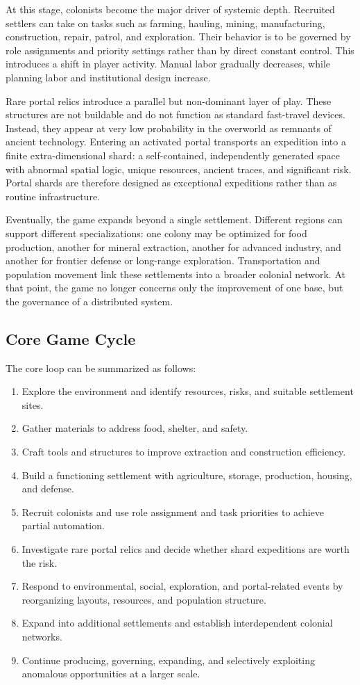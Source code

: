 \documentclass[conference]{IEEEtran}
\begin{document}
At this stage, colonists become the major driver of systemic depth. Recruited settlers can take on tasks such as farming, hauling, mining, manufacturing, construction, repair, patrol, and exploration. Their behavior is to be governed by role assignments and priority settings rather than by direct constant control. This introduces a shift in player activity. Manual labor gradually decreases, while planning labor and institutional design increase.

Rare portal relics introduce a parallel but non-dominant layer of play. These structures are not buildable and do not function as standard fast-travel devices. Instead, they appear at very low probability in the overworld as remnants of ancient technology. Entering an activated portal transports an expedition into a finite extra-dimensional shard: a self-contained, independently generated space with abnormal spatial logic, unique resources, ancient traces, and significant risk. Portal shards are therefore designed as exceptional expeditions rather than as routine infrastructure.

Eventually, the game expands beyond a single settlement. Different regions can support different specializations: one colony may be optimized for food production, another for mineral extraction, another for advanced industry, and another for frontier defense or long-range exploration. Transportation and population movement link these settlements into a broader colonial network. At that point, the game no longer concerns only the improvement of one base, but the governance of a distributed system.

\subsection{Core Game Cycle}
The core loop can be summarized as follows:
\begin{enumerate}
  \item Explore the environment and identify resources, risks, and suitable settlement sites.
  \item Gather materials to address food, shelter, and safety.
  \item Craft tools and structures to improve extraction and construction efficiency.
  \item Build a functioning settlement with agriculture, storage, production, housing, and defense.
  \item Recruit colonists and use role assignment and task priorities to achieve partial automation.
  \item Investigate rare portal relics and decide whether shard expeditions are worth the risk.
  \item Respond to environmental, social, exploration, and portal-related events by reorganizing layouts, resources, and population structure.
  \item Expand into additional settlements and establish interdependent colonial networks.
  \item Continue producing, governing, expanding, and selectively exploiting anomalous opportunities at a larger scale.
\end{enumerate}
\end{document}
